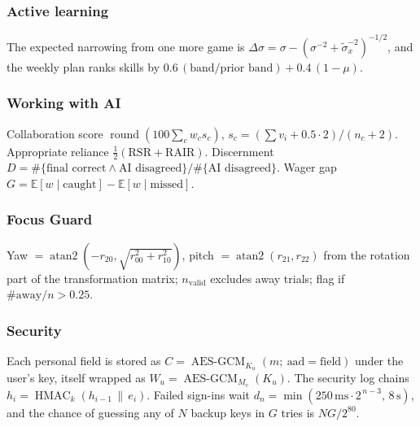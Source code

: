 \documentclass[11pt,a4paper]{article}
\begin{document}
\subsubsection{Active learning} The expected narrowing from one more game is $\Delta\sigma=\sigma-(\sigma^{-2}+\tilde\sigma_x^{-2})^{-1/2}$, and the weekly plan ranks skills by $0.6\,(\text{band}/\text{prior band})+0.4\,(1-\mu)$.

\subsubsection{Working with AI} Collaboration score $\operatorname{round}(100\sum_c w_c s_c)$, $s_c=(\sum v_i+0.5\cdot2)/(n_c+2)$. Appropriate reliance $\tfrac12(\text{RSR}+\text{RAIR})$. Discernment $D=\#\{\text{final correct}\wedge\text{AI disagreed}\}/\#\{\text{AI disagreed}\}$. Wager gap $G=\mathbb E[w\mid\text{caught}]-\mathbb E[w\mid\text{missed}]$.

\ifcamera\subsubsection{Focus Guard} Yaw $=\operatorname{atan2}(-r_{20},\sqrt{r_{00}^2+r_{10}^2})$, pitch $=\operatorname{atan2}(r_{21},r_{22})$ from the rotation part of the transformation matrix; $n_{\text{valid}}$ excludes away trials; flag if $\#\text{away}/n>0.25$.\fi

\subsubsection{Security} Each personal field is stored as $C=\operatorname{AES\text{-}GCM}_{K_u}(m;\ \text{aad}=\text{field})$ under the user's key, itself wrapped as $W_u=\operatorname{AES\text{-}GCM}_{M_v}(K_u)$. The security log chains $h_i=\operatorname{HMAC}_k(h_{i-1}\,\|\,e_i)$. Failed sign-ins wait $d_n=\min(250\,\text{ms}\cdot2^{\,n-3},\,8\,\text{s})$, and the chance of guessing any of $N$ backup keys in $G$ tries is $NG/2^{80}$.
\end{document}
